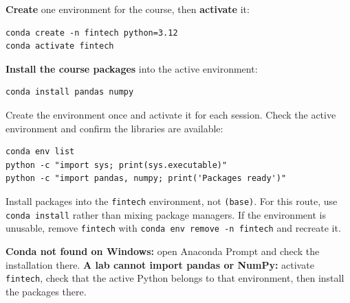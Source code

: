 \textbf{Create} one environment for the course, then \textbf{activate} it:

\begin{lstlisting}[style=utpterminal]
conda create -n fintech python=3.12
conda activate fintech
\end{lstlisting}

\textbf{Install the course packages} into the active environment:

\begin{lstlisting}[style=utpterminal]
conda install pandas numpy
\end{lstlisting}

Create the environment once and activate it for each session. Check the
active environment and confirm the libraries are available:

\begin{lstlisting}[style=utpterminal]
conda env list
python -c "import sys; print(sys.executable)"
python -c "import pandas, numpy; print('Packages ready')"
\end{lstlisting}

\begin{pitfall}
Install packages into the \texttt{fintech} environment, not \texttt{(base)}.
For this route, use \texttt{conda install} rather than mixing package
managers. If the environment is unusable, remove \texttt{fintech} with
\texttt{conda env remove -n fintech} and recreate it.
\end{pitfall}

\begin{troubleshoot}
\textbf{Conda not found on Windows:} open Anaconda Prompt and check the
installation there. \textbf{A lab cannot import pandas or NumPy:} activate
\texttt{fintech}, check that the active Python belongs to that environment, then install the packages there.
\end{troubleshoot}